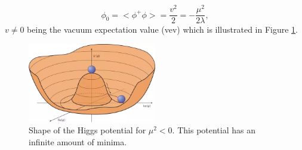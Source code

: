 \begin{equation}
    \phi_{0}=<\phi^{+} \phi>=\frac{v^{2}}{2}=-\frac{\mu^{2}}{2 \lambda},
\end{equation}
$v\neq0$ being the vacuum expectation value (vev) which is illustrated in Figure \ref{fig:chap1:Higggs_potential}.
\begin{figure}[htbp]
    \centering
    \includegraphics[width=0.5\textwidth]{Ch1/Img/Higgs_potential.png}
    \caption{Shape of the Higgs potential for $\mu^{2} < 0$. This potential has an infinite amount of minima. \cite{HiggsPotential}}
    \label{fig:chap1:Higggs_potential}
\end{figure}

